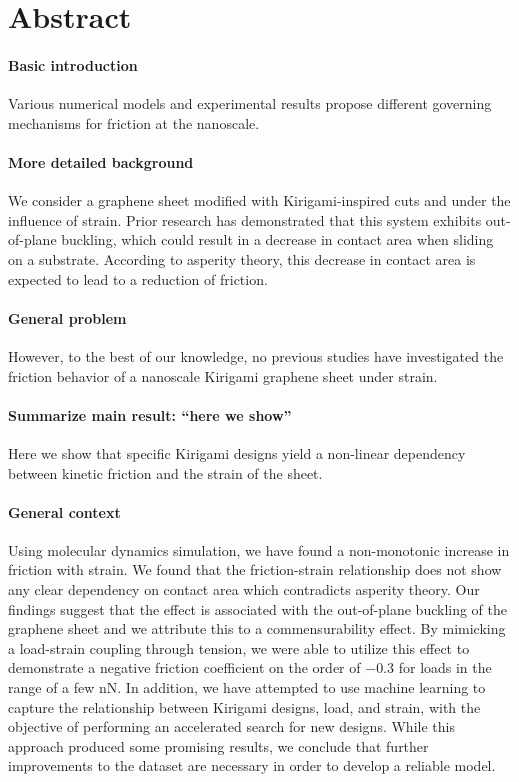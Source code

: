 \chapter*{Abstract} 


\subsubsection*{Basic introduction}
Various numerical models and experimental results propose different governing mechanisms for friction at the nanoscale.


\subsubsection*{More detailed background}

We consider a graphene sheet modified with Kirigami-inspired cuts and under the influence of strain. Prior research has demonstrated that this system exhibits out-of-plane buckling, which could result in a decrease in contact area when sliding on a substrate. According to asperity theory, this decrease in contact area is expected to lead to a reduction of friction.


\subsubsection*{General problem}
However, to the best of our knowledge, no previous studies have investigated the friction behavior of a nanoscale Kirigami graphene sheet under strain. 


\subsubsection*{Summarize main result: ``here we show''}
Here we show that specific Kirigami designs yield a non-linear dependency between kinetic friction and the strain of the sheet.


\subsubsection*{General context}
Using molecular dynamics simulation, we have found a non-monotonic increase in friction with strain. We found that the friction-strain relationship does not show any clear dependency on contact area which contradicts asperity theory. Our findings suggest that the effect is associated with the out-of-plane buckling of the graphene sheet and we attribute this to a commensurability effect. By mimicking a load-strain coupling through tension, we were able to utilize this effect to demonstrate a negative friction coefficient on the order of $-0.3$ for loads in the range of a few nN. In addition, we have attempted to use machine learning to capture the relationship between Kirigami designs, load, and strain, with the objective of performing an accelerated search for new designs. While this approach produced some promising results, we conclude that further improvements to the dataset are necessary in order to develop a reliable model.

